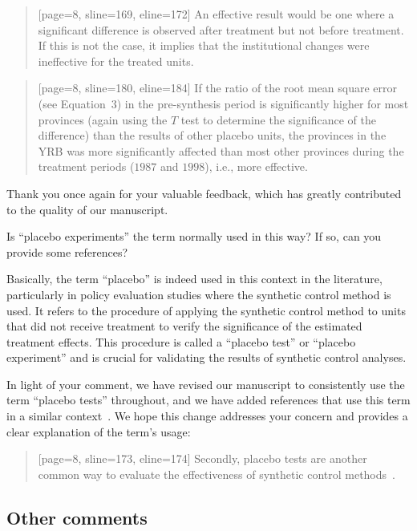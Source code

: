 \begin{quote}[page=8, sline=169, eline=172]
    An effective result would be one where a significant difference is observed after treatment but not before treatment. If this is not the case, it implies that the institutional changes were ineffective for the treated units.
\end{quote}

\begin{quote}[page=8, sline=180, eline=184]
    If the ratio of the root mean square error (see Equation~3) in the pre-synthesis period is significantly higher for most provinces (again using the $T$ test to determine the significance of the difference) than the results of other placebo units, the provinces in the YRB was more significantly affected than most other provinces during the treatment periods ($1987$ and $1998$), i.e., more effective.
\end{quote}

\AR*{} Thank you once again for your valuable feedback, which has greatly contributed to the quality of our manuscript.

\RC{} Is ``placebo experiments'' the term normally used in this way? If so, can you provide some references?

\AR{} Basically, the term ``placebo'' is indeed used in this context in the literature, particularly in policy evaluation studies where the synthetic control method is used. It refers to the procedure of applying the synthetic control method to units that did not receive treatment to verify the significance of the estimated treatment effects. This procedure is called a ``placebo test'' or ``placebo experiment'' and is crucial for validating the results of synthetic control analyses.

\AR*{} In light of your comment, we have revised our manuscript to consistently use the term ``placebo tests'' throughout, and we have added references that use this term in a similar context~\cite{abadie2010}. We hope this change addresses your concern and provides a clear explanation of the term's usage:

\begin{quote}[page=8, sline=173, eline=174]
    Secondly, placebo tests are another common way to evaluate the effectiveness of synthetic control methods~\cite{abadie2010}.
\end{quote}

\subsection{Other comments}\label{sec:1-3}

